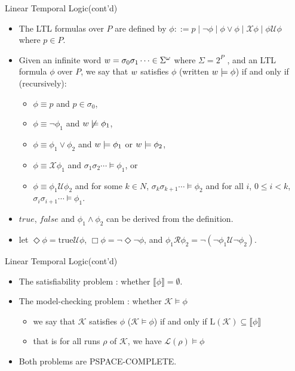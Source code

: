\documentclass[12pt]{beamer}
\begin{document}
\begin{frame}{Linear Temporal Logic(cont'd)}
	\begin{itemize}
		\item The LTL formulas over $P$ are defined by $\phi ::= p \mid \neg\phi \mid \phi \lor \phi \mid \mathbin{\mathcal{X}}\phi \mid \phi \mathbin{\mathcal{U}} \phi$ where $p \in P$.
		\item Given an infinite word $\mathnormal{w} = \sigma_{0}\sigma_{1}\cdots \in \Sigma^{\omega}$ where $\Sigma = 2^{P}$ , and an LTL formula $\phi$ over $P$, we say that $\mathnormal{w}$ satisfies $\phi$ (written $\mathnormal{w} \models \phi$) if and only if (recursively):
		\begin{itemize}
			\item $\phi \equiv p$ and $p \in \sigma_{0}$,
			\item $\phi \equiv \neg\phi_{1}$ and $\mathnormal{w} \not\models \phi_{1}$,
			\item $\phi \equiv \phi_{1} \lor \phi_{2}$ and $\mathnormal{w} \models \phi_{1}$ or $\mathnormal{w} \models \phi_{2}$,
			\item $\phi \equiv \mathbin{\mathcal{X}}\phi_{1}$ and $\sigma_{1}\sigma_{2}\cdots \models \phi_{1}$, or
			\item $\phi \equiv \phi_{1}\mathbin{\mathcal{U}}\phi_{2}$ and for some $k \in N$, $\sigma_{k}\sigma_{k+1}\cdots \models \phi_{2}$ and for all $i$, $0 \leq i < k$,
$\sigma_{i}\sigma_{i+1}\cdots \models \phi_{1}$.
		\end{itemize}
		\item $true$, $false$ and $\phi_{1} \land \phi_{2}$ can be derived from the definition.
		\item let $\Diamond\phi = \text{true} \mathbin{\mathcal{U}}\phi$, $\Box\phi =
\neg\Diamond\neg\phi$, and $\phi_{1}\mathbin{\mathcal{R}}\phi_{2} = \neg(\neg\phi_{1}\mathbin{\mathcal{U}}\neg\phi_{2})$.
	\end{itemize}
\end{frame}

\begin{frame}{Linear Temporal Logic(cont'd)}
	\begin{itemize}
		\item The satisfiability problem : whether $\llbracket \phi \rrbracket = \emptyset$.
		
		\item The model-checking problem : whether $\mathcal{K} \models \phi$
		\begin{itemize}
			\item we say that $\mathcal{K}$ satisfies $\phi$ ($\mathcal{K} \models \phi$) if and only if $\text{L}(\mathcal{K}) \subseteq \llbracket \phi \rrbracket$
			\item that is for all runs $\rho$ of $\mathcal{K}$, we have $\mathcal{L}(\rho) \models \phi$
		\end{itemize}
		\item Both problems are PSPACE-COMPLETE.
	\end{itemize}
\end{frame}
\end{document}
